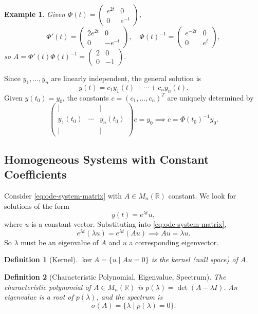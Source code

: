 \documentclass{article}
\newtheorem{definition}{Definition}
\newtheorem*{example}{Example}
\newcommand{\R}{\mathbb{R}}
\begin{document}
\begin{example}
    Given $\Phi(t) = \begin{pmatrix}e^{2t}&0\\0&e^{-t}\end{pmatrix}$,
    \[\Phi'(t) = \begin{pmatrix}2e^{2t}&0\\0&-e^{-t}\end{pmatrix}, 
    \quad \Phi(t)^{-1} = \begin{pmatrix}e^{-2t}&0\\0&e^t
    \end{pmatrix},\]
    so $A = \Phi'(t)\Phi(t)^{-1} = \begin{pmatrix}2&0\\0&-1
    \end{pmatrix}$.
\end{example}

Since $y_1,\ldots,y_n$ are linearly independent, the general 
solution is
\[y(t) = c_1 y_1(t) + \cdots + c_n y_n(t).\]
Given $y(t_0) = y_0$, the constants $c = (c_1,\ldots,c_n)^T$ 
are uniquely determined by
\[\begin{pmatrix}|&&|\\ y_1(t_0)&\cdots&y_n(t_0)\\|&&|
\end{pmatrix}c = y_0 \implies c = \Phi(t_0)^{-1} y_0.\]

\subsection{Homogeneous Systems with Constant Coefficients}
\label{sec:const-coeff}

Consider \eqref{eq:ode-system-matrix} with $A \in M_n(\R)$ 
constant. We look for solutions of the form
\begin{equation}
    \label{eq:exp-ansatz}
    y(t) = e^{\lambda t}u,
\end{equation}
where $u$ is a constant vector. Substituting into 
\eqref{eq:ode-system-matrix},
\[e^{\lambda t}(\lambda u) = e^{\lambda t}(Au) \implies Au = 
\lambda u.\]
So $\lambda$ must be an eigenvalue of $A$ and $u$ a corresponding 
eigenvector.

\begin{definition}[Kernel]
    $\ker A = \{u \mid Au = 0\}$ is the kernel (null space) of $A$.
\end{definition}

\begin{definition}[Characteristic Polynomial, Eigenvalue, Spectrum]
    The \emph{characteristic polynomial} of $A \in M_n(\R)$ 
    is $p(\lambda) = \det(A - \lambda I)$. An \emph{eigenvalue} is a 
    root of $p(\lambda)$, and the \emph{spectrum} is
    \[\sigma(A) = \{\lambda \mid p(\lambda) = 0\}.\]
\end{definition}
\end{document}
